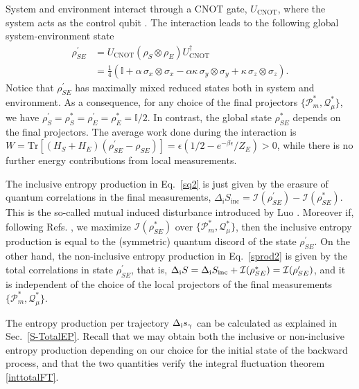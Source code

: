 \documentclass[aps,prx,twocolumn,showpacs,floatfix,superscriptaddress,graphics,longbibliography]{revtex4-1}
\newcommand{\tr}{\mathrm{Tr}}
\begin{document}
System and environment interact through a CNOT gate, $U_\mathrm{CNOT}$, where the system  acts as the control qubit \cite{NielsenChuang}. The interaction leads to the following global system-environment state
\begin{align}\label{rhosep}
 \rho_{SE}^\prime &= U_\mathrm{CNOT} \left( \rho_S \otimes \rho_E \right) U_\mathrm{CNOT}^\dagger  \\ 
 &= \frac{1}{4}\left(\mathbb{I}+  \alpha \, \sigma_x \otimes \sigma_x - \alpha \kappa \,\sigma_y \otimes \sigma_y + \kappa\, \sigma_z \otimes \sigma_z \right). \nonumber
\end{align}
Notice that $\rho_{SE}^\prime$ has maximally mixed reduced states both in system and environment. 
As a consequence, for any choice of the final projectors $\{ \mathcal{P}_m^\ast, \mathcal{Q}_\mu^\ast\}$, we have $\rho_S^\prime = \rho_S^\ast =\rho_E^\prime = \rho_E^\ast= \mathbb{I}/2$. In contrast, the global state $\rho_{SE}^\ast$ depends on the 
final projectors. 
The average work done during the interaction is $W = \tr[(H_S + H_E) (\rho_{SE}^\prime- \rho_{SE})] = \epsilon (1/2 - e^{-\beta \epsilon}/Z_E)>0$, while there is no further energy contributions from local measurements.

The inclusive entropy production in Eq.~\eqref{sq2} is just given by the erasure of quantum correlations in the final measurements, $\Delta_\mathrm{i} S_\mathrm{inc} = \mathcal{I}(\rho_{SE}^\prime) - \mathcal{I}(\rho_{SE}^\ast)$. This is the so-called mutual induced disturbance introduced by Luo \cite{Luo08}. Moreover if, following Refs. \cite{Simdisc1,Simdisc2}, we maximize $\mathcal{I}(\rho_{SE}^\ast)$ over $\{ \mathcal{P}_m^\ast, \mathcal{Q}_\mu^\ast\}$, 
then the inclusive entropy production is equal to the (symmetric) quantum discord \cite{ZurekDiscord, ModiRev} of the state $\rho_{SE}^\prime$.
On the other hand, the non-inclusive entropy production in Eq.~\eqref{sprod2} is given 
by the total correlations in state $\rho_{SE}^\prime$, that is, $\Delta_\mathrm{i} S = \Delta_\mathrm{i} S_{\rm inc} + \mathcal{I}(\rho_{SE}^\ast) = \mathcal{I}(\rho_{SE}^\prime)$, and it is independent of the choice of the local projectors of the final measurements $\{ \mathcal{P}_m^\ast, \mathcal{Q}_\mu^\ast\}$.


The entropy production per trajectory $\Delta_{\rm i} s_\gamma$ can be calculated as explained in Sec.~\ref{S-TotalEP}. Recall that we may obtain both the inclusive or non-inclusive entropy production
depending on our choice for the initial state of the backward process, and that the two quantities verify the integral fluctuation theorem \eqref{inttotalFT}.
\end{document}
